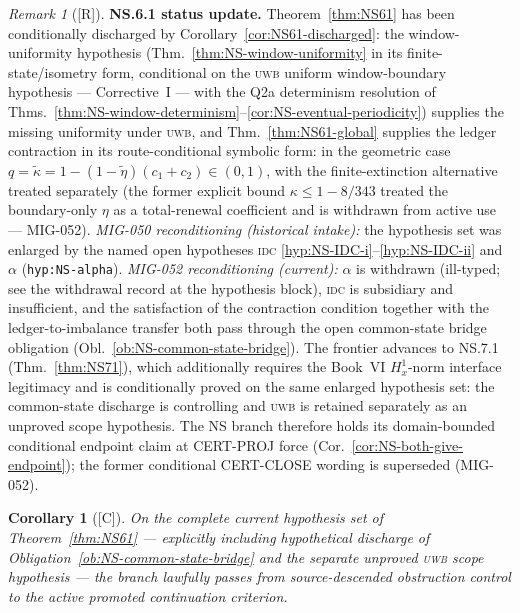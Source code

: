 \documentclass[12pt,oneside]{amsbook}
\theoremstyle{plain}
\newtheorem{corollary}[theorem]{Corollary}
\theoremstyle{definition}
\theoremstyle{remark}
\newtheorem{remark}[theorem]{Remark}
\newcommand{\status}[1]{\textup{[#1]}}
\begin{document}
\begin{remark}[\status{R}]\label{rmk:NS61-missing}
\textbf{NS.6.1 status update.}
Theorem~\ref{thm:NS61} has been conditionally discharged by
Corollary~\ref{cor:NS61-discharged}: the window-uniformity
hypothesis (Thm.~\ref{thm:NS-window-uniformity} in its
finite-state/isometry form, conditional on the \textsc{uwb}
uniform window-boundary hypothesis --- Corrective~I --- with the
Q2a determinism resolution of
Thms.~\ref{thm:NS-window-determinism}--\ref{cor:NS-eventual-periodicity})
supplies the missing uniformity under \textsc{uwb}, and
Thm.~\ref{thm:NS61-global} supplies the ledger contraction in its
route-conditional symbolic form: in the geometric case
$q=\widetilde\kappa = 1-(1-\widetilde\eta)(c_1+c_2)\in(0,1)$,
with the finite-extinction alternative treated separately (the
former explicit bound $\kappa \le 1-8/343$ treated the
boundary-only $\eta$ as a total-renewal coefficient and is
withdrawn from active use --- MIG-052). \emph{MIG-050
reconditioning (historical intake):} the hypothesis set was enlarged
by the named open hypotheses \textsc{idc}
\eqref{hyp:NS-IDC-i}--\eqref{hyp:NS-IDC-ii} and $\alpha$
(\texttt{hyp:NS-alpha}). \emph{MIG-052 reconditioning (current):}
$\alpha$ is withdrawn (ill-typed; see the withdrawal record at the
hypothesis block), \textsc{idc} is subsidiary and insufficient, and
the satisfaction of the contraction condition together with the
ledger-to-imbalance transfer both pass through the open common-state
bridge obligation (Obl.~\ref{ob:NS-common-state-bridge}). The
frontier advances to NS.7.1 (Thm.~\ref{thm:NS71}), which additionally
requires the Book~VI $H^1_x$-norm interface legitimacy and is
conditionally proved on the same enlarged hypothesis set: the
common-state discharge is controlling and \textsc{uwb} is retained
separately as an unproved scope hypothesis. The NS branch therefore
holds its domain-bounded
conditional endpoint claim at CERT-PROJ force
(Cor.~\ref{cor:NS-both-give-endpoint}); the former conditional
CERT-CLOSE wording is superseded (MIG-052).
\end{remark}

\begin{corollary}[\status{C}]\label{cor:NS61-consequence}
On the complete current hypothesis set of
Theorem~\ref{thm:NS61} --- explicitly including hypothetical
discharge of Obligation~\ref{ob:NS-common-state-bridge} and the
separate unproved \textsc{uwb} scope hypothesis --- the branch lawfully
passes from source-descended obstruction control to the active
promoted continuation criterion.
\end{corollary}
\end{document}
